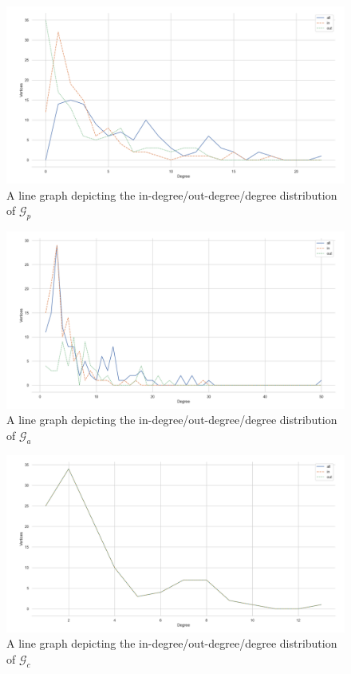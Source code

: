 \documentclass[11pt,a4paper]{book}
\theoremstyle{definition}
\theoremstyle{definition}
\theoremstyle{definition}
\theoremstyle{remark}
\newcommand{\pgraph}{\mathcal{G}_{p}}
\newcommand{\agraph}{\mathcal{G}_{a}}
\newcommand{\cgraph}{\mathcal{G}_{c}}
\begin{document}
\begin{figure}[h]
\includegraphics[width=\textwidth]{degree_distribution.png}
\caption{A line graph depicting the in-degree/out-degree/degree distribution of $\pgraph$}
\label{fig:pgraph-degree_distr}
\end{figure}


\begin{figure}[h]
\includegraphics[width=\textwidth]{agraph_degree_distribution.png}
\caption{A line graph depicting the in-degree/out-degree/degree distribution of $\agraph$}
\label{fig:agraph-degree_distr}
\end{figure}



\begin{figure}[h]
\includegraphics[width=\textwidth]{cgraph_degree_distribution.png}
\caption{A line graph depicting the in-degree/out-degree/degree distribution of $\cgraph$}
\label{fig:cgraph-degree_distr}
\end{figure}
\end{document}
